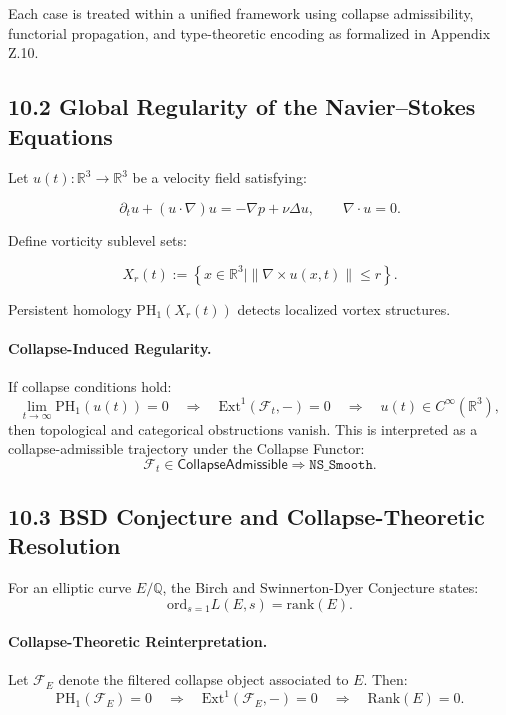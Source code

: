\documentclass[11pt]{article}
\begin{document}
Each case is treated within a unified framework using collapse admissibility, functorial propagation, and type-theoretic encoding as formalized in Appendix Z.10.

\subsection*{10.2 Global Regularity of the Navier–Stokes Equations}

Let \( u(t) : \mathbb{R}^3 \to \mathbb{R}^3 \) be a velocity field satisfying:

\[
\partial_t u + (u \cdot \nabla)u = -\nabla p + \nu \Delta u, \qquad \nabla \cdot u = 0.
\]

Define vorticity sublevel sets:

\[
X_r(t) := \left\{ x \in \mathbb{R}^3 \mid \| \nabla \times u(x,t) \| \leq r \right\}.
\]

Persistent homology \( \mathrm{PH}_1(X_r(t)) \) detects localized vortex structures.

\paragraph{Collapse-Induced Regularity.}
If collapse conditions hold:
\[
\lim_{t \to \infty} \mathrm{PH}_1(u(t)) = 0 \quad \Rightarrow \quad \mathrm{Ext}^1(\mathcal{F}_t, -) = 0 \quad \Rightarrow \quad u(t) \in C^\infty(\mathbb{R}^3),
\]
then topological and categorical obstructions vanish. This is interpreted as a collapse-admissible trajectory under the Collapse Functor:
\[
\mathcal{F}_t \in \mathsf{CollapseAdmissible} \Rightarrow \texttt{NS\_Smooth}.
\]

\subsection*{10.3 BSD Conjecture and Collapse-Theoretic Resolution}

For an elliptic curve \( E/\mathbb{Q} \), the Birch and Swinnerton-Dyer Conjecture states:
\[
\mathrm{ord}_{s=1} L(E, s) = \mathrm{rank}(E).
\]

\paragraph{Collapse-Theoretic Reinterpretation.}
Let \( \mathcal{F}_E \) denote the filtered collapse object associated to \( E \). Then:
\[
\mathrm{PH}_1(\mathcal{F}_E) = 0 \quad \Rightarrow \quad \mathrm{Ext}^1(\mathcal{F}_E, -) = 0 \quad \Rightarrow \quad \mathrm{Rank}(E) = 0.
\]
\end{document}
